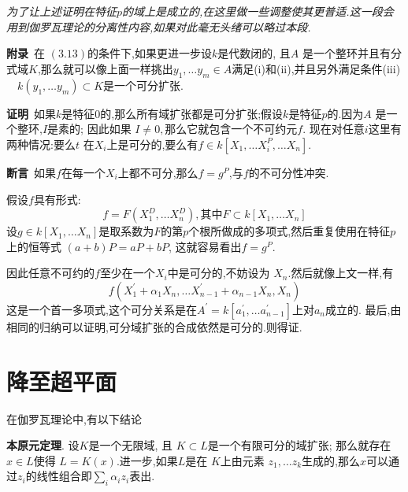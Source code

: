 \documentclass[UTF8]{book}
\begin{document}
		
	\section{}
		\textit{为了让上述证明在特征$ p $的域上是成立的,在这里做一些调整使其更普适.这一段会用到伽罗瓦理论的分离性内容,如果对此毫无头绪可以略过本段.}
		
		\textbf{附录}\ 在 $(3.13)$的条件下,如果更进一步设$k$是代数闭的, 且$A$ 是一个整环并且有分式域$K$,那么就可以像上面一样挑出$y_{1}, \ldots y_{m} \in A$满足(i)和(ii),并且另外满足条件(iii) $\quad k \left(y _{1}, \dots y _{ m }\right) \subset K$是一个可分扩张.
		
		
		\textbf{证明}\ 如果$k$是特征$0$的,那么所有域扩张都是可分扩张;假设$k$是特征$ p $的.因为$A$ 是一个整环,$ I $是素的; 因此如果 $I \neq 0,$那么它就包含一个不可约元$ f $. 现在对任意$ i $这里有两种情况:要么$t$ 在$X _{ i }$上是可分的,要么有$f \in k \left[ X _{1}, \ldots X _{ i }^{ P }, \ldots X _{ n }\right]$.
		
		
		\textbf{断言}\ 如果$ f $在每一个$ X_{i} $上都不可分,那么$ f = g^{P} $,与$ f $的不可分性冲突.
		
		假设$f$具有形式:
		\begin{equation*}
		f = F \left(X _{1}^{ D }, \ldots X _{ n }^{ D }\right), \text {其中} F \subset k \left[ X _{1}, \ldots X _{ n }\right]
		\end{equation*}
		设$g \in k \left[ X _{1}, \ldots X _{ n }\right]$是取系数为$F$的第$ p $个根所做成的多项式,然后重复使用在特征$ p $上的恒等式 $(a+b) P=a P+b P$, 这就容易看出$ f = g^{P} $.
		
		因此任意不可约的$f$至少在一个$X_{i}$中是可分的,不妨设为 $X _{ n } .$然后就像上文一样,有
		\begin{equation*}
		f \left(X _{1}^{\prime}+\alpha_{1} X _{ n }, \ldots X _{ n -1}^{\prime}+\alpha_{ n -1} X _{ n }, X _{ n }\right)
		\end{equation*}
		这是一个首一多项式,这个可分关系是在$A ^{\prime}= k \left[ a _{1}^{\prime},\ldots a _{ n -1}^{\prime}\right]$上对$ a_{n} $成立的. 最后,由相同的归纳可以证明,可分域扩张的合成依然是可分的.则得证.
		
		
	\section{降至超平面}
		在伽罗瓦理论中,有以下结论
		
		\textbf{本原元定理}. 设$K$是一个无限域, 且 $K \subset L$是一个有限可分的域扩张; 那么就存在$x \in L$使得 $L=K(x) .$进一步,如果$ L $是在 $K$上由元素 $z_{1}, \ldots z_{k }  $生成的,那么$x$可以通过$ z_{i} $的线性组合即$\sum_{i} \alpha_{i} z_{i}$表出.
		
\end{document}
